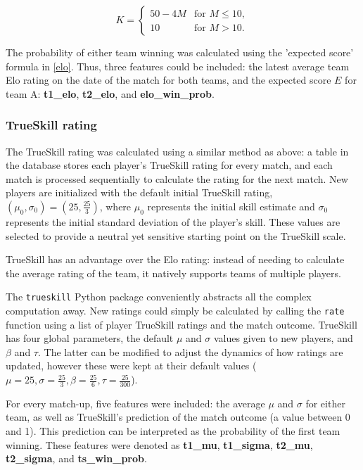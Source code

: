 \[ K = \begin{cases} 50 - 4M & \text{for } M \leq 10, \\ 10 & \text{for } M > 10. \end{cases} \]

The probability of either team winning was calculated using the 'expected score' formula in \ref{elo}. Thus, three features could be included: the latest average team Elo rating on the date of the match for both teams, and the expected score $E$ for team A: \textbf{t1\_elo}, \textbf{t2\_elo}, and \textbf{elo\_win\_prob}. 

\subsubsection{TrueSkill rating}

The TrueSkill rating was calculated using a similar method as above: a table in the database stores each player's TrueSkill rating for every match, and each match is processed sequentially to calculate the rating for the next match. New players are initialized with the default initial TrueSkill rating, $(\mu_0, \sigma_0) = (25, \frac{25}{3})$, where $\mu_0$ represents the initial skill estimate and $\sigma_0$ represents the initial standard deviation of the player's skill. These values are selected to provide a neutral yet sensitive starting point on the TrueSkill scale.

TrueSkill has an advantage over the Elo rating: instead of needing to calculate the average rating of the team, it natively supports teams of multiple players.

The \texttt{trueskill} Python package conveniently abstracts all the complex computation away. New ratings could simply be calculated by calling the \texttt{rate} function using a list of player TrueSkill ratings and the match outcome. TrueSkill has four global parameters, the default $\mu$ and $\sigma$ values given to new players, and $\beta$ and $\tau$. The latter can be modified to adjust the dynamics of how ratings are updated, however these were kept at their default values ($\mu = 25, \sigma = \frac{25}{3}, \beta = \frac{25}{6}, \tau = \frac{25}{300}$).

For every match-up, five features were included: the average $\mu$ and $\sigma$ for either team, as well as TrueSkill's prediction of the match outcome (a value between 0 and 1). This prediction can be interpreted as the probability of the first team winning. These features were denoted as \textbf{t1\_mu}, \textbf{t1\_sigma}, \textbf{t2\_mu}, \textbf{t2\_sigma}, and \textbf{ts\_win\_prob}.

